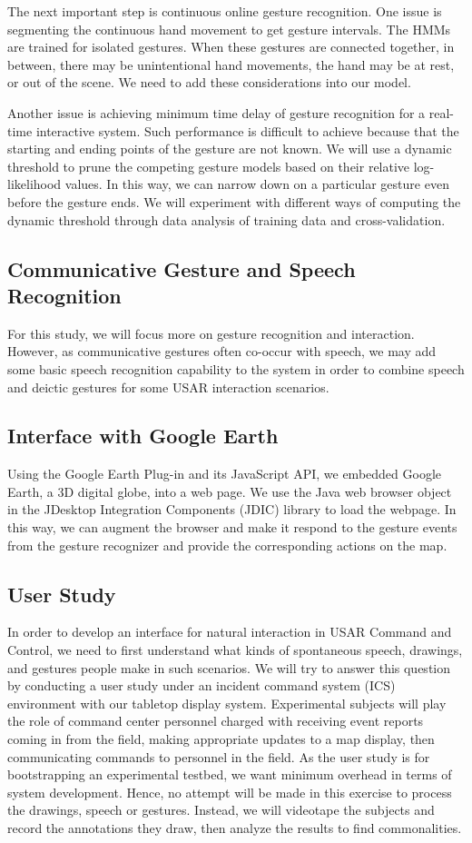 The next important step is continuous online gesture recognition. One issue is segmenting the continuous hand movement to get gesture intervals. The HMMs are trained for isolated gestures. When these gestures are connected together, in between, there may be unintentional hand movements, the hand may be at rest, or out of the scene. We need to add these considerations into our model.

Another issue is achieving minimum time delay of gesture recognition for a real-time interactive system. Such performance is difficult to achieve because that the starting and ending points of the gesture are not known. We will use a dynamic threshold to prune the competing gesture models based on their relative log-likelihood values. In this way, we can narrow down on a particular gesture even before the gesture ends. We will experiment with different ways of computing the dynamic threshold through data analysis of training data and cross-validation.
 
\subsection{Communicative Gesture and Speech Recognition} 
For this study, we will focus more on gesture recognition and interaction. However, as communicative gestures often co-occur with speech, we may add some basic speech recognition capability to the system in order to combine speech and deictic gestures for some USAR interaction scenarios.

\subsection{Interface with Google Earth}
Using the Google Earth Plug-in and its JavaScript API,  we embedded Google Earth, a 3D digital globe, into a web page. We use the Java web browser object in the JDesktop Integration Components (JDIC) library to load the webpage. In this way, we can augment the browser and make it respond to the gesture events from the gesture recognizer and provide the corresponding actions on the map. 

\subsection{User Study}\label{sec:userStudy}
In order to develop an interface for natural interaction in USAR Command and Control, we need to first understand what kinds of spontaneous speech, drawings, and gestures people make in such scenarios. We will try to answer this question by conducting a user study under an incident command system (ICS) environment with our tabletop display system. Experimental subjects will play the role of command center personnel charged with receiving event reports coming in from the field, making appropriate updates to a map display, then communicating commands to personnel in the field. As the user study is for bootstrapping an experimental testbed, we want minimum overhead in terms of system development. Hence, no attempt will be made in this exercise to process the drawings, speech or gestures. Instead, we will videotape the subjects and record the annotations they draw, then analyze the results to find commonalities. 

